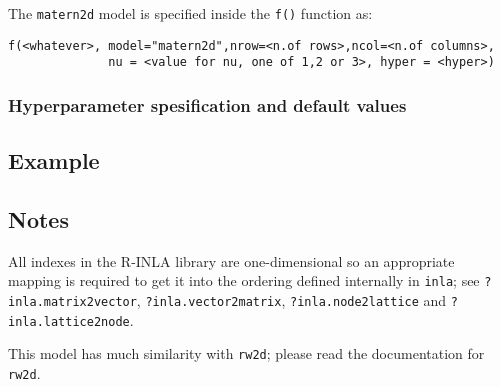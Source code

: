 \documentclass[a4paper,11pt]{article}
\begin{document}
The {\tt matern2d} model is specified inside the {\tt f()} function as:
\begin{verbatim}
f(<whatever>, model="matern2d",nrow=<n.of rows>,ncol=<n.of columns>,
              nu = <value for nu, one of 1,2 or 3>, hyper = <hyper>)
\end{verbatim}

\subsubsection*{Hyperparameter spesification and default values}



\subsection*{Example}



\subsection*{Notes}
All indexes in the R-INLA library are one-dimensional so an
appropriate mapping is required to get it into the ordering defined
internally in \verb|inla|; see \verb|?inla.matrix2vector|,
\verb|?inla.vector2matrix|, \verb|?inla.node2lattice| and
\verb|?inla.lattice2node|.

This model has much similarity with \verb|rw2d|; please read the
documentation for \verb|rw2d|.

\end{document}
